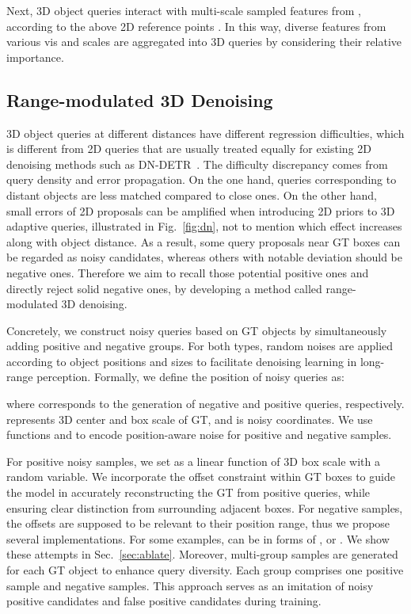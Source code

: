 \documentclass[letterpaper]{article} \usepackage{aaai24}
\begin{document}
Next, 3D object queries interact with multi-scale sampled features from , according to the above 2D reference points . In this way, diverse features from various vis and scales are aggregated into 3D queries by considering their relative importance.




\subsection{Range-modulated 3D Denoising} \label{sec:denoise}


3D object queries at different distances have different regression difficulties, which is different from 2D queries that are usually treated equally for existing 2D denoising methods such as DN-DETR~\cite{li2022dn}. 
The difficulty discrepancy comes from query density and error propagation. On the one hand, queries corresponding to distant objects are less matched compared to close ones. On the other hand, small errors of 2D proposals can be amplified when introducing 2D priors to 3D adaptive queries, illustrated in Fig.~\ref{fig:dn}, not to mention which effect increases along with object distance. 
As a result, some query proposals near GT boxes can be regarded as noisy candidates, whereas others with notable deviation should be negative ones.
Therefore we aim to recall those potential positive ones and directly reject solid negative ones, by developing a method called range-modulated 3D denoising.


Concretely, we construct noisy queries based on GT objects by simultaneously adding positive and negative groups. For both types, random noises are applied according to object positions and sizes to facilitate denoising learning in long-range perception. Formally, we define the position of noisy queries as:

where  corresponds to the generation of negative and positive queries, respectively.  represents 3D center  and box scale  of GT, and  is noisy coordinates. We use functions  and  to encode position-aware noise for positive and negative samples.

For positive noisy samples, we set  as a linear function of 3D box scale with a random variable. 
We incorporate the offset constraint within GT boxes to guide the model in accurately reconstructing the GT from positive queries, while ensuring clear distinction from surrounding adjacent boxes.
For negative samples, the offsets are supposed to be relevant to their position range, thus we propose several implementations. For some examples,  can be in forms of ,  or . We show these attempts in Sec.~\ref{sec:ablate}. 
Moreover, multi-group samples are generated for each GT object to enhance query diversity. Each group comprises one positive sample and  negative samples. This approach serves as an imitation of noisy positive candidates and false positive candidates during training.
\end{document}
